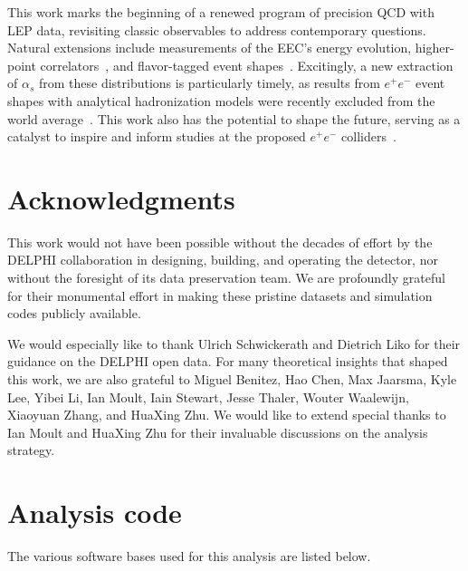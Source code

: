 \documentclass[a4paper,11pt]{article}
\begin{document}
This work marks the beginning of a renewed program of precision QCD with LEP data, revisiting classic observables to address contemporary questions. Natural extensions include measurements of the EEC's energy evolution, higher-point correlators~\cite{Budhraja:2024xiq,Alipour-fard:2024szj}, and flavor-tagged event shapes~\cite{Craft:2022kdo}. Excitingly, a new extraction of \(\alpha_s\) from these distributions is particularly timely, as results from \(e^+e^-\) event shapes with analytical hadronization models were recently excluded from the world average~\cite{ParticleDataGroup:2020ssz,ParticleDataGroup:2022pth}. This work also has the potential to shape the future, serving as a catalyst to inspire and inform studies at the proposed $e^{+}e^{-}$ colliders~\cite{Benedikt:2651299, CEPCStudyGroup:2018rmc, CEPCStudyGroup:2025kmw}.

\clearpage
\section*{Acknowledgments}
This work would not have been possible without the decades of effort by the DELPHI collaboration in designing, building, and operating the detector, nor without the foresight of its data preservation team. We are profoundly grateful for their monumental effort in making these pristine datasets and simulation codes publicly available.

We would especially like to thank Ulrich Schwickerath and Dietrich Liko for their guidance on the DELPHI open data. For many theoretical insights that shaped this work, we are also grateful to Miguel Benitez, Hao Chen, Max Jaarsma, Kyle Lee, Yibei Li, Ian Moult, Iain Stewart, Jesse Thaler, Wouter Waalewijn, Xiaoyuan Zhang, and HuaXing Zhu. We would like to extend special thanks to Ian Moult and HuaXing Zhu for their invaluable discussions on the analysis strategy.

\clearpage


\typeout{}

\clearpage
\appendix

\section{Analysis code}
\label{app:analysiscode}
The various software bases used for this analysis are listed below. 
\end{document}
